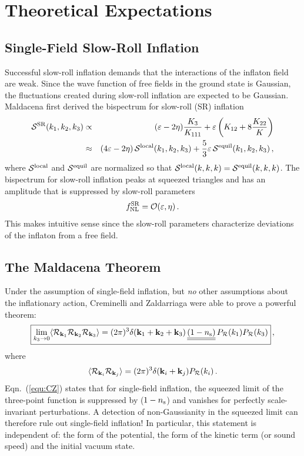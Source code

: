 \documentclass[12pt,letterpaper,rotate]{article}
\def\beq{\begin{equation}}
\def\eeq{\end{equation}}
\def\bea{\begin{eqnarray}}
\def\eea{\end{eqnarray}}
\def\R{{\cal R}}
\begin{document}
{\section{Theoretical Expectations}

\subsection{Single-Field Slow-Roll Inflation}

Successful slow-roll inflation demands that the interactions of the inflaton field are weak. Since the wave function of free fields in the ground state is Gaussian, the fluctuations created during slow-roll inflation are expected to be Gaussian.
Maldacena \cite{malda} first derived the bispectrum for slow-roll (SR) inflation
\bea
{\cal S}^{\rm SR}(k_1, k_2, k_3) &\propto& ( \varepsilon - 2 \eta) \frac{K_3}{K_{111}} + \varepsilon \left(K_{12} + 8 \frac{K_{22}}{K} \right) \\
&\approx& (4 \varepsilon - 2 \eta) \, {\cal S}^{\rm local}(k_1, k_2, k_3) + \frac{5}{3} \varepsilon \, {\cal S}^{\rm equil}(k_1, k_2, k_3)\, , \label{equ:SSR}
\eea
where ${\cal S}^{\rm local}$ and ${\cal S}^{\rm equil}$ are normalized so that ${\cal S}^{\rm local}(k,k,k) = {\cal S}^{\rm equil}(k,k,k)$.
The bispectrum for slow-roll inflation peaks at squeezed triangles and has an amplitude that is suppressed by slow-roll parameters \cite{malda}
\beq
f_{\rm NL}^{\rm SR} = {\cal O}(\varepsilon, \eta)\, . 
\eeq
This makes intuitive sense since the slow-roll parameters characterize deviations of the inflaton from a free field.

\subsection{The Maldacena Theorem}

Under the assumption of single-field inflation, but {\it no} other assumptions about the inflationary action,
Creminelli and Zaldarriaga \cite{Creminelli:2004yq} were able to prove a powerful theorem: %
\beq
\label{equ:CZ}
\fbox{$\displaystyle
\lim_{k_3 \to 0} \langle \R_{{\bf k}_1} \R_{{\bf k}_2} \R_{{\bf k}_3} \rangle = (2\pi)^3 \delta({\bf k}_1 + {\bf k}_2 + {\bf k}_3) \, \underline{\underline{(1-n_{\rm s})}} \, P_\R(k_1) P_\R(k_3) $} \, ,
\eeq
where
\beq
\langle \R_{{\bf k}_i} \R_{{\bf k}_j} \rangle = (2\pi)^3 \delta({\bf k}_i + {\bf k}_j) P_\R(k_i)\, .
\eeq
Eqn.~(\ref{equ:CZ}) states that for single-field inflation, the squeezed limit of the three-point function is suppressed by ($1-n_{\rm s}$) and vanishes for perfectly scale-invariant perturbations.
A detection of non-Gaussianity in the squeezed limit can therefore rule out single-field inflation!
In particular, this statement is independent of: the form of the potential, the form of the kinetic term (or sound speed) and the initial vacuum state.

}
\end{document}
